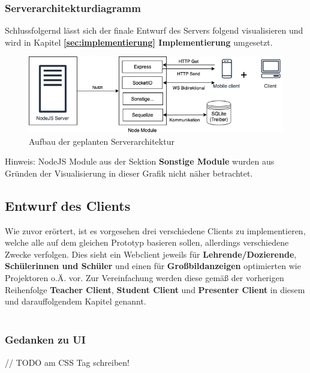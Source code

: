 \subsubsection{Serverarchitekturdiagramm}\label{sec:serverarchitekt}
Schlussfolgernd lässt sich der finale Entwurf des Servers folgend visualisieren und wird in Kapitel \textbf{\ref{sec:implementierung} Implementierung} umgesetzt.

\begin{figure}[H]
	\centering
	\includegraphics[width=0.8\linewidth]{bilder/server_architektur}
	\caption[Aufbau der geplanten Serverarchitektur]{Aufbau der geplanten Serverarchitektur}
	\label{fig:server_diagram}
\end{figure}
\footnotesize{Hinweis: NodeJS Module aus der Sektion \textbf{Sonstige Module} wurden aus Gründen der Visualisierung in dieser Grafik nicht näher betrachtet. }

\subsection{Entwurf des Clients}\label{sec:clientkonzept}
Wie zuvor erörtert, ist es vorgesehen drei verschiedene Clients zu implementieren, welche alle auf dem gleichen Prototyp basieren sollen, allerdings verschiedene Zwecke verfolgen. Dies sieht ein Webclient jeweils für \textbf{Lehrende/Dozierende}, \textbf{Schülerinnen und Schüler} und einen für \textbf{Großbildanzeigen} optimierten wie Projektoren o.Ä. vor. Zur Vereinfachung werden diese gemäß der vorherigen Reihenfolge \textbf{Teacher Client}, \textbf{Student Client} und \textbf{Presenter Client} in diesem und darauffolgendem Kapitel genannt.\\ \\ 

\subsubsection{Gedanken zu UI}\label{sec:uientwurf}
// TODO am CSS Tag schreiben!
